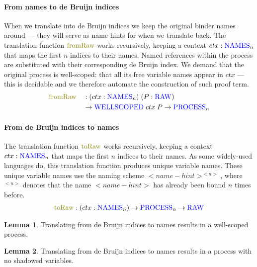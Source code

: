 \documentclass[sigplan,10pt,anonymous,review]{acmart}
\theoremstyle{definition}
\newtheorem{nilemma}{Lemma}
\newcommand{\type}[1]{\textcolor{blue}{\operatorname{#1}}}
\newcommand{\func}[1]{\textcolor{olive}{\operatorname{#1}}}
\newcommand{\Process}{\type{PROCESS}}
\newcommand{\Raw}{\type{RAW}}
\newcommand{\Names}{\type{NAMES}}
\newcommand{\WellScoped}{\type{WELLSCOPED}}
\begin{document}
\paragraph{From names to de Bruijn indices}
When we translate into de Bruijn indices we keep the original binder names around --- they will serve as name hints for when we translate back.
The translation function $\func{fromRaw}$ works recursively, keeping a context $ctx : \Names_n$ that maps the first $n$ indices to their names.
Named references within the process are substituted with their corresponding de Bruijn index.
We demand that the original process is well-scoped: that all its free variable names appear in $ctx$ --- this is decidable and we therefore automate the construction of such proof term.
\begin{equation*}
  \begin{aligned}
    &\func{fromRaw} && : (ctx : \Names_n) \; (P : \Raw) \\
    &               && \to \WellScoped \; ctx \; P \to \Process_n \\
  \end{aligned}
\end{equation*}

\paragraph{From de Bruijn indices to names}
The translation function $\func{toRaw}$ works recursively, keeping a context $ctx : \Names_n$ that maps the first $n$ indices to their names.
As some widely-used languages do, this translation function produces unique variable names.
These unique variable names use the naming scheme $<name-hint>^{<n>}$, where $^{<n>}$ denotes that the name $<name-hint>$ has already been bound $n$ times before.
\begin{equation*}
  \begin{aligned}
    \func{toRaw} : (ctx : \Names_n) \to \Process_n \to \Raw
  \end{aligned}
\end{equation*}

\begin{nilemma}
  Translating from de Bruijn indices to names results in a well-scoped process.
\end{nilemma}

\begin{nilemma}
  Translating from de Bruijn indices to names results in a process with no shadowed variables.
\end{nilemma}
\end{document}
